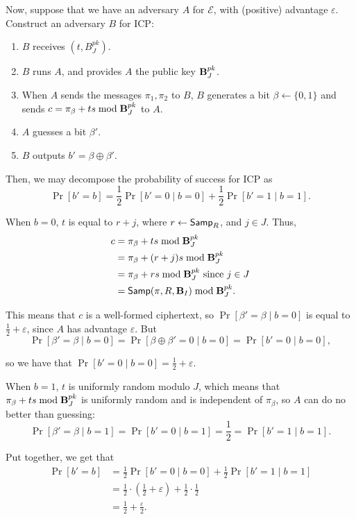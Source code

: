 Now, suppose that we have an adversary $A$ for $\mathcal{E}$, with (positive) advantage $\varepsilon$. Construct an adversary $B$ for ICP:
\begin{enumerate}
\item $B$ receives $(t, B_J^{pk})$.
\item $B$ runs $A$, and provides $A$ the public key $\textbf{B}_J^{pk}$.
\item When $A$ sends the messages $\pi_1, \pi_2$ to $B$, $B$ generates a bit $\beta \leftarrow \{0, 1\}$ and sends $c = \pi_\beta + ts \bmod \textbf{B}_J^{pk}$ to $A$.
\item $A$ guesses a bit $\beta'$.
\item $B$ outputs $b' = \beta \oplus \beta'$.
\end{enumerate}

Then, we may decompose the probability of success for ICP as
\[\Pr[b' = b] = \frac{1}{2} \Pr[b' = 0 \mid b = 0] + \frac{1}{2} \Pr[b' = 1 \mid b = 1].\]

When $b = 0$, $t$ is equal to $r + j$, where $r \leftarrow {\sf Samp}_R$, and $j \in J$. Thus,
\begin{align*}
c &= \pi_\beta + ts \bmod \textbf{B}_J^{pk} \\
&= \pi_\beta + (r + j)s \bmod \textbf{B}_J^{pk} \\
&= \pi_\beta + rs \bmod \textbf{B}_J^{pk} \text{ since $j \in J$} \\
&= {\sf Samp}(\pi, R, \textbf{B}_I) \bmod \textbf{B}_J^{pk}.
\end{align*}

This means that $c$ is a well-formed ciphertext, so $\Pr[\beta' = \beta \mid b = 0]$ is equal to $\frac{1}{2} + \varepsilon$, since $A$ has advantage $\varepsilon$. But
\[\Pr[\beta' = \beta \mid b = 0] = \Pr[\beta \oplus \beta' = 0 \mid b = 0] = \Pr[b' = 0 \mid b = 0],\]

so we have that $\Pr[b' = 0 \mid b = 0] = \frac{1}{2} + \varepsilon$.

When $b = 1$, $t$ is uniformly random modulo $J$, which means that $\pi_\beta + ts \bmod \textbf{B}_J^{pk}$ is uniformly random and is independent of $\pi_\beta$, so $A$ can do no better than guessing:
\[\Pr[\beta' = \beta \mid b = 1] = \Pr[b' = 0 \mid b = 1] = \frac{1}{2} = \Pr[b' = 1 \mid b = 1].\]

Put together, we get that
\begin{align*}
    \Pr[b' = b] &= \frac{1}{2} \Pr[b' = 0 \mid b = 0] + \frac{1}{2} \Pr[b' = 1 \mid b = 1] \\
    &= \frac{1}{2} \cdot (\frac{1}{2} + \varepsilon) + \frac{1}{2} \cdot \frac{1}{2} \\
    &= \frac{1}{2} + \frac{\varepsilon}{2}.
\end{align*}

